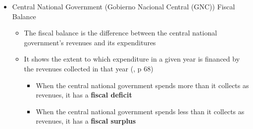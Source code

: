 \documentclass[
  ignorenonframetext,
  english,
]{beamer}
\begin{document}
\begin{frame}{}
\label{section-6}
\begin{itemize}
\item
  Central National Government (Gobierno Nacional Central (GNC)) Fiscal
  Balance

  \begin{itemize}
  \item
    The fiscal balance is the difference between the central national
    government's revenues and its expenditures
  \item
    It shows the extent to which expenditure in a given year is financed
    by the revenues collected in that year
    (, p 68)

    \begin{itemize}
    \item
      When the central national government spends more than it collects
      as revenues, it has a \textbf{fiscal deficit}
    \item
      When the central national government spends less than it collects
      as revenues, it has a \textbf{fiscal surplus}
    \end{itemize}
  \end{itemize}
\end{itemize}
\end{frame}
\end{document}
